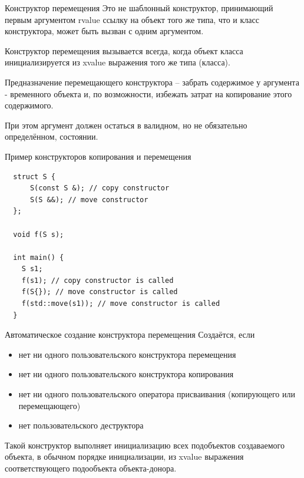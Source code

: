 \documentclass[unknownkeysallowed,xcolor=table]{beamer}
\begin{document}
\begin{frame}{Конструктор перемещения}
  Это не шаблонный конструктор, принимающий первым аргументом rvalue ссылку на объект того же типа, что и класс конструктора, может быть вызван с одним аргументом.

  \vspace{1em}

  Конструктор перемещения вызывается всегда, когда объект класса инициализируется из xvalue выражения того же типа (класса).

  \vspace{1em}

  Предназначение перемещающего конструктора -- забрать содержимое у аргумента - временного объекта и, по возможности, избежать затрат на копирование этого содержимого. 

  При этом аргумент должен остаться в валидном, но не обязательно определённом, состоянии.
\end{frame}

\begin{frame}[fragile]{Пример конструкторов копирования и перемещения}
  \begin{lstlisting}
  struct S {
      S(const S &); // copy constructor
      S(S &&); // move constructor
  };

  void f(S s);

  int main() {
    S s1;
    f(s1); // copy constructor is called
    f(S{}); // move constructor is called
    f(std::move(s1)); // move constructor is called
  }
  \end{lstlisting}
\end{frame}

\begin{frame}{Автоматическое создание конструктора перемещения}
  Создаётся, если
  \begin{itemize}
    \item нет ни одного пользовательского конструктора перемещения \vspace{0.5em}
    \item нет ни одного пользовательского конструктора копирования \vspace{0.5em}
    \item нет ни одного пользовательского оператора присваивания (копирующего или перемещающего) \vspace{0.5em}
    \item нет пользовательского деструктора
  \end{itemize}

  \vspace{1em}

  Такой конструктор выполняет инициализацию всех подобъектов создаваемого объекта, в обычном порядке инициализации, из xvalue выражения соответствующего подообъекта
  объекта-донора.
\end{frame}
\end{document}
